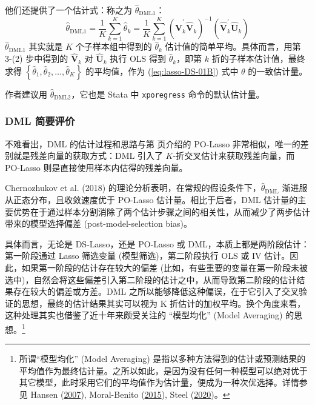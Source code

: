 {他们还提供了一个估计式：称之为 $\widehat{\theta}_{\mathrm{DML1}}$：
\begin{equation}\label{eq:lasso-DML-02}
	 \widehat{\theta}_{\mathrm{DML1}}
	 = 
	 \frac{1}{K}
	 	 \sum_{k=1}^{K}\widehat{\theta}_k
	 = 
	 \frac{1}{K}
	 \sum_{k=1}^{K}\left(\widehat{\boldsymbol{V}}_{k}^{\prime} \widehat{\boldsymbol{V}}_{k}\right)^{-1}\left(\widehat{\boldsymbol{V}}_{k}^{\prime} \widehat{\boldsymbol{U}}_{k}\right)
\end{equation}
$\widehat{\theta}_{\mathrm{DML1}}$ 其实就是 $K$ 个子样本组中得到的 $\widehat{\theta}_k$ 估计值的简单平均。具体而言，用第 3-(2) 步中得到的 $\widehat{\boldsymbol{V}}_{k}$ 对 $\widehat{\boldsymbol{U}}_{k}$ 执行 OLS 得到 $\widehat{\theta}_k$，即第 $k$ 折的子样本估计值，最终求得 $\left\{\widehat{\theta}_1, \widehat{\theta}_2, \ldots, \widehat{\theta}_K \right\}$ 的平均值，作为 (\ref{eq:lasso-DS-01B}) 式中 $\theta$ 的一致估计量。

作者建议用 $\widehat{\theta}_{\mathrm{DML2}}$，它也是 Stata 中 \texttt{xporegress} 命令的默认估计量。 

\subsubsection{DML 简要评价}
不难看出，DML 的估计过程和思路与第 \pageref{page:lasso-polasso} 页介绍的 PO-Lasso 非常相似，唯一的差别就是残差向量的获取方式：DML 引入了 $K$-折交叉估计来获取残差向量，而 PO-Lasso 则是直接使用样本内估得的残差向量。

Chernozhukov et al. (2018) 的理论分析表明，在常规的假设条件下，$\widehat{\theta}_{\mathrm{DML}}$ 渐进服从正态分布，且收敛速度优于 PO-Lasso 估计量。相比于后者，DML 估计量的主要优势在于通过样本分割消除了两个估计步骤之间的相关性，从而减少了两步估计带来的模型选择偏差 (post-model-selection bias)。

具体而言，无论是 DS-Lasso，还是 PO-Lasso 或 DML，本质上都是两阶段估计：第一阶段通过  Lasso 筛选变量 (模型筛选)，第二阶段执行 OLS 或 IV 估计。因此，如果第一阶段的估计存在较大的偏差 (比如，有些重要的变量在第一阶段未被选中)，自然会将这些偏差引入第二阶段的估计之中，从而导致第二阶段的估计结果存在较大的偏差或方差。DML 之所以能够降低这种偏误，在于它引入了交叉验证的思想，最终的估计结果其实可以视为 K 折估计的加权平均。换个角度来看，这种处理其实也借鉴了近十年来颇受关注的 “模型均化” (Model Averaging) 的思想。\footnote{%
  所谓“模型均化” (Model Averaging) 是指以多种方法得到的估计或预测结果的平均值作为最终估计量。之所以如此，是因为没有任何一种模型可以绝对优于其它模型，此时采用它们的平均值作为估计量，便成为一种次优选择。详情参见 Hansen (\href{http://sci-hub.ren/10.1111/j.1468-0262.2007.00785.x}{2007}), Moral-Benito (\href{http://sci-hub.ren/10.1111/joes.12044}{2015}), Steel (\href{http://sci-hub.ren/10.1257/jel.20191385}{2020})。}

}
